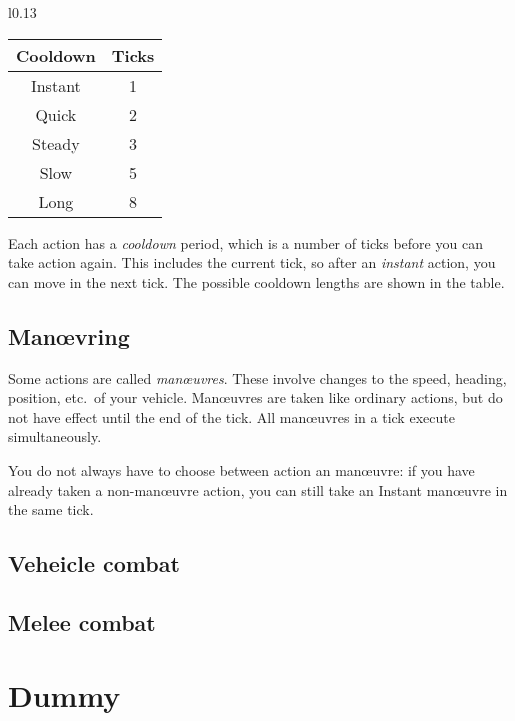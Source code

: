 \documentclass[10pt, a4paper, twocolumn]{article}
\begin{document}
\begin{wraptable}[7]{l}{0.13\textwidth}
\vspace*{-3ex}
\begin{tabular}{cc}
  Cooldown & Ticks \\
  \hline 
  Instant  & 1     \\
  Quick    & 2     \\
  Steady   & 3     \\
  Slow     & 5     \\
  Long     & 8
\end{tabular}
\end{wraptable}

Each action has a \emph{cooldown} period, which is a number of ticks before you
can take action again. This includes the current tick, so after an
\emph{instant} action, you can move in the next tick. The possible cooldown
lengths are shown in the table.

\subsection{Man\oe{}vring}
Some actions are called \emph{man\oe{}uvres}. These involve changes to the speed,
heading, position, etc.\ of your vehicle. Man\oe{}uvres are taken like ordinary
actions, but do not have effect until the end of the tick. All man\oe{}uvres in a
tick execute simultaneously.

You do not always have to choose between action an man\oe{}uvre: if you have
already taken a non-man\oe{}uvre action, you can still take an Instant
man\oe{}uvre in the same tick. 



\subsection{Veheicle combat}
\subsection{Melee combat}

\section{Dummy}
\lipsum{}
\end{document}

